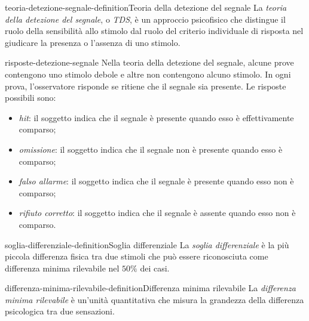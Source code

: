 \documentclass[preview]{standalone}
\begin{document}
\begin{snippetdefinition}{teoria-detezione-segnale-definition}{Teoria della detezione del segnale}
    La \emph{teoria della detezione del segnale}, o \emph{TDS}, è un approccio
    psicofisico che distingue il ruolo della sensibilità allo stimolo dal ruolo
    del criterio individuale di risposta nel giudicare la presenza o l'assenza
    di uno stimolo.
\end{snippetdefinition}

\begin{snippet}{risposte-detezione-segnale}
    Nella teoria della detezione del segnale, alcune prove contengono uno
    stimolo debole e altre non contengono alcuno stimolo. In ogni prova,
    l'osservatore risponde se ritiene che il segnale sia presente. Le risposte
    possibili sono:
    \begin{itemize}
        \item \emph{hit}: il soggetto indica che il segnale è presente quando
        esso è effettivamente comparso;
        \item \emph{omissione}: il soggetto indica che il segnale non è
        presente quando esso è comparso;
        \item \emph{falso allarme}: il soggetto indica che il segnale è
        presente quando esso non è comparso;
        \item \emph{rifiuto corretto}: il soggetto indica che il segnale è
        assente quando esso non è comparso.
    \end{itemize}
\end{snippet}


\begin{snippetdefinition}{soglia-differenziale-definition}{Soglia differenziale}
    La \emph{soglia differenziale} è la più piccola differenza fisica tra due
    stimoli che può essere riconosciuta come differenza minima rilevabile nel
    \(50\%\) dei casi.
\end{snippetdefinition}

\begin{snippetdefinition}{differenza-minima-rilevabile-definition}{Differenza minima rilevabile}
    La \emph{differenza minima rilevabile} è un'unità quantitativa che misura la
    grandezza della differenza psicologica tra due sensazioni.
\end{snippetdefinition}
\end{document}
